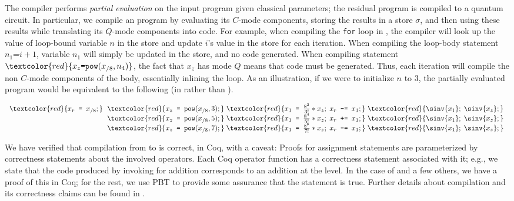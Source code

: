 
The \vqimp compiler performs \emph{partial evaluation} \cite{partialeval} 
on the input program given
classical parameters; the residual program is compiled to a quantum
circuit.
%
In particular, we compile an \vqimp program by evaluating its $C$-mode
components, storing the results in a store $\sigma$, and then
using these results while translating its $Q$-mode components
into \oqasm code. For example, when compiling the \texttt{for} loop in
, the compiler will look up the value of
loop-bound variable $n$ in the store and update $i$'s value in the
store for each iteration. When compiling the loop-body statement
$n_1\texttt{=} i + 1$, variable $n_1$ will simply be updated in the
store, and no code generated. When compiling statement
$\textcolor{red}{x_z \texttt{=} \texttt{pow}({x_{/8}},n_4)}$, the fact that $x_z$ has
mode $Q$ means that \oqasm code must be generated. Thus, each iteration will
compile the non $C$-mode components of the body, essentially inlining the
loop. As an illustration, if we were to initialize $n$
to 3, the partially evaluated program would be equivalent to the
following (in \oqasm rather than \vqimp).

{
\begin{footnotesize}
\begin{center}
$
\begin{array}{l@{~}l}
\textcolor{red}{x_r\texttt{ = }x_{/8};}\; &
\textcolor{red}{{x_z}\texttt{ = }\texttt{pow}(x_{/8},3);}\;
\textcolor{red}{{x_1}\texttt{ = }{\frac{8^2}{3!}}*{x_z};\;{x_r}\texttt{ -= }{x_1};}\;
\textcolor{red}{\sinv{x_1};\;\sinv{x_z};}
\\
&\textcolor{red}{{x_z}\texttt{ = }\texttt{pow}(x_{/8},5);}\;
\textcolor{red}{{x_1}\texttt{ = }{\frac{8^4}{5!}}*{x_z};\;{x_r}\texttt{ += }{x_1};}\;
\textcolor{red}{\sinv{x_1};\;\sinv{x_z};}\;
\\
&\textcolor{red}{{x_z}\texttt{ = }\texttt{pow}(x_{/8},7);}\;
\textcolor{red}{{x_1}\texttt{ = }{\frac{8^6}{7!}}*{x_z};\;{x_r}\texttt{ -= }{x_1};}\;
\textcolor{red}{\sinv{x_1};\;\sinv{x_z};}
\end{array}
$
\end{center}
\end{footnotesize}
}

We have verified that compilation from \vqimp to \oqasm is correct, in
Coq, with a caveat: Proofs for assignment statements are
parameterized by correctness statements about the involved operators.
Each Coq operator function has a correctness statement associated with it; e.g., 
we state that the \oqasm code
produced by invoking  for addition corresponds to an addition at
the \vqimp level. In the case of  and a few others, we
have a proof of this in Coq; for the rest, we use PBT to provide some
assurance that the statement is true. Further details about \vqimp compilation and its correctness claims can be found in .
